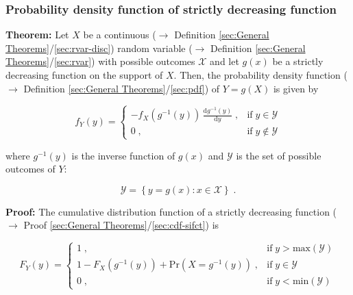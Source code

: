 \documentclass[a4paper,12pt,twoside]{book}
\begin{document}
\subsubsection[\textbf{Probability density function of strictly decreasing function}]{Probability density function of strictly decreasing function} \label{sec:pdf-sdfct}
\setcounter{equation}{0}

\textbf{Theorem:} Let $X$ be a continuous ($\rightarrow$ Definition \ref{sec:General Theorems}/\ref{sec:rvar-disc}) random variable ($\rightarrow$ Definition \ref{sec:General Theorems}/\ref{sec:rvar}) with possible outcomes $\mathcal{X}$ and let $g(x)$ be a strictly decreasing function on the support of $X$. Then, the probability density function ($\rightarrow$ Definition \ref{sec:General Theorems}/\ref{sec:pdf}) of $Y = g(X)$ is given by

\begin{equation} \label{eq:pdf-sdfct-pdf-sdfct}
f_Y(y) = \left\{
\begin{array}{rl}
-f_X(g^{-1}(y)) \, \frac{\mathrm{d}g^{-1}(y)}{\mathrm{d}y} \; , & \text{if} \; y \in \mathcal{Y} \\
0 \; , & \text{if} \; y \notin \mathcal{Y}
\end{array}
\right.
\end{equation}

where $g^{-1}(y)$ is the inverse function of $g(x)$ and $\mathcal{Y}$ is the set of possible outcomes of $Y$:

\begin{equation} \label{eq:pdf-sdfct-Y-range}
\mathcal{Y} = \left\lbrace y = g(x): x \in \mathcal{X} \right\rbrace \; .
\end{equation}


\vspace{1em}
\textbf{Proof:} The cumulative distribution function of a strictly decreasing function ($\rightarrow$ Proof \ref{sec:General Theorems}/\ref{sec:cdf-sifct}) is

\begin{equation} \label{eq:pdf-sdfct-cdf-sdfct}
F_Y(y) = \left\{
\begin{array}{rl}
1 \; , & \text{if} \; y > \mathrm{max}(\mathcal{Y}) \\
1 - F_X(g^{-1}(y)) + \mathrm{Pr}(X = g^{-1}(y)) \; , & \text{if} \; y \in \mathcal{Y} \\
0 \; , & \text{if} \; y < \mathrm{min}(\mathcal{Y})
\end{array}
\right.
\end{equation}
\end{document}
